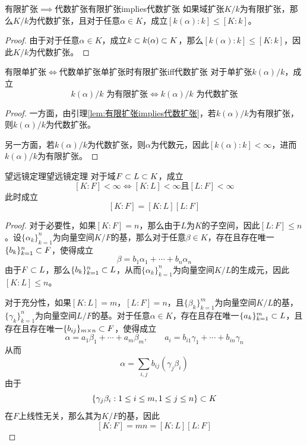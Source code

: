 \begin{lemma}{有限扩张$\implies$代数扩张}{有限扩张implies代数扩张}
	如果域扩张$K/k$为有限扩张，那么$K/k$为代数扩张，且对于任意$\alpha\in K$，成立$[k(\alpha):k]\le [K:k]$。
\end{lemma}

\begin{proof}
	由于对于任意$\alpha\in K$，成立$k\subset k(\alpha)\subset K$，那么$[k(\alpha):k]\le [K:k]$，因此$K/k$为代数扩张。
\end{proof}

\begin{lemma}{有限单扩张$\iff$代数单扩张}{单扩张时有限扩张iff代数扩张}
	对于单扩张$k(\alpha)/k$，成立%
	$$
	k(\alpha)/k\text{ 为有限扩张}
	\iff k(\alpha)/k\text{ 为代数扩张}
	$$
\end{lemma}

\begin{proof}
	一方面，由引理\ref{lem:有限扩张implies代数扩张}，若$k(\alpha)/k$为有限扩张，则$k(\alpha)/k$为代数扩张。
	
	另一方面，若$k(\alpha)/k$为代数扩张，则$\alpha$为代数元，因此$[k(\alpha):k]<\infty$，进而$k(\alpha)/k$为有限扩张。
\end{proof}

\begin{proposition}{望远镜定理}{望远镜定理}
	对于域$F\subset L\subset K$，成立
	$$
	[K:F]<\infty\iff [K:L]<\infty\text{且}[L:F]<\infty
	$$
	此时成立
	$$
	[K:F]=[K:L][L:F]
	$$
\end{proposition}

\begin{proof}
	对于必要性，如果$[K:F]=n$，那么由于$L$为$K$的子空间，因此$[L:F]\le n$。设$\{\alpha_k\}_{k=1}^{n}$为向量空间$K/F$的基，那么对于任意$\beta\in K$，存在且存在唯一$\{b_k\}_{k=1}^{n}\subset F$，使得成立
	$$
	\beta=b_1\alpha_1+\cdots+b_n\alpha_n
	$$
	由于$F\subset L$，那么$\{b_k\}_{k=1}^{n}\subset L$，从而$\{\alpha_k\}_{k=1}^{n}$为向量空间$K/L$的生成元，因此$[K:L]\le n$。
	
	对于充分性，如果$[K:L]=m$，$[L:F]=n$，且$\{\beta_k\}_{k=1}^{m}$为向量空间$K/L$的基，$\{\gamma_k\}_{k=1}^{n}$为向量空间$L/F$的基。对于任意$\alpha\in K$，存在且存在唯一$\{a_k\}_{k=1}^{m}\subset L$，且存在且存在唯一$\{b_{ij}\}_{m\times n}\subset F$，使得成立
	$$
	\alpha=a_1\beta_1+\cdots+a_m\beta_m,\qquad 
	a_i=b_{i1}\gamma_1+\cdots+b_{in}\gamma_n
	$$
	从而
	$$
	\alpha=\sum_{i,j}b_{ij}(\gamma_{j}\beta_{i})
	$$
	由于
	$$
	\{ \gamma_{j}\beta_{i}:1\le i\le m,1\le j\le n \}\subset K
	$$
	在$F$上线性无关，那么其为$K/F$的基，因此
	$$
	[K:F]=mn=[K:L][L:F]
	$$
\end{proof}

